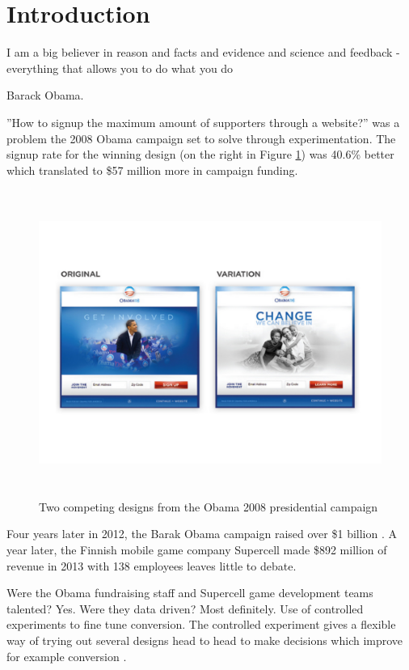 \documentclass[english,12pt,a4paper,pdftex,elec,utf8]{aaltothesis}
\begin{document}
\section{Introduction}
\thispagestyle{empty}
\epigraph{I am a big believer in reason and facts and evidence and science and feedback - everything that allows you to do what you do} {Barack Obama. \cite{wired-abtesting}}

''How to signup the maximum amount of supporters through a website?'' was a problem the 2008 Obama campaign set to solve through experimentation. The signup rate for the winning design (on the right in Figure \ref{obama}) was 40.6\% better which translated to \$57 million more in campaign funding.\cite{Siroker2013}

\begin{figure}[htb]
\centering \includegraphics[height=10cm]{diagrams/obama2008}
\caption{Two competing designs from the Obama 2008 presidential campaign \cite[Fig. 1.3]{Siroker2013}\label{obama}}
\end{figure}

Four years later in 2012, the Barak Obama campaign raised over \$1 billion \cite{Ashkenas2012}. A year later, the Finnish mobile game company Supercell made \$892 million of revenue in 2013 with 138 employees leaves little to debate\cite{forbes-supercell}.

Were the Obama fundraising staff and Supercell game development teams talented? Yes. Were they data driven? Most definitely. Use of controlled experiments to fine tune conversion. The controlled experiment gives a flexible way of trying out several designs head to head to make decisions which improve for example conversion \cite{Siroker2013}.
\end{document}
